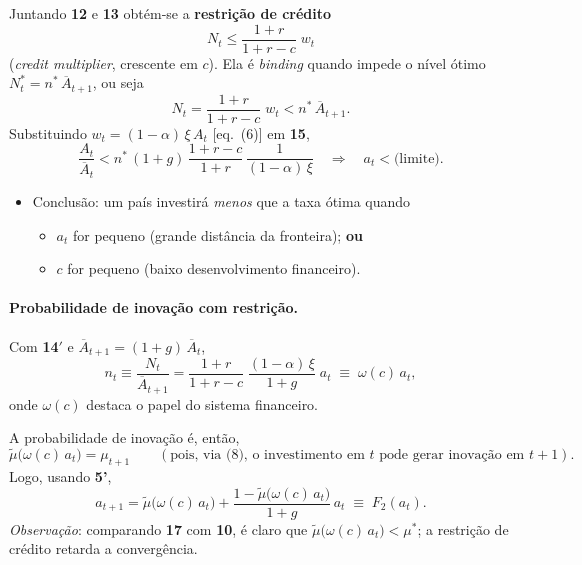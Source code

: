 \documentclass[a4paper,12pt]{article}[abntex2]
\begin{document}
\medskip
Juntando \textbf{12} e \textbf{13} obtém‐se a \textbf{restrição de crédito}
\[
    \boxed{N_t \le \frac{1+r}{1+r-c}\;w_t}
    \tag{14$'$}
\]
(\emph{credit multiplier}, crescente em $c$).  
Ela é \emph{binding} quando impede o nível ótimo $N_t^{\ast}=n^{\ast}\,\overline{A}_{t+1}$, ou seja
\[
    N_t = \frac{1+r}{1+r-c}\;w_t
          < n^{\ast}\,\overline{A}_{t+1}.
    \tag{15}
\]
Substituindo $w_t=(1-\alpha)\,\xi\,A_t$ [eq.\ (6)] em \textbf{15},
\[
    \frac{A_t}{\overline{A}_t}
      < n^{\ast}\,(1+g)\,
        \frac{1+r-c}{1+r}\,
        \frac{1}{(1-\alpha)\,\xi}
      \quad\Longrightarrow\quad
      a_t<\text{(limite)}.
    \tag{16}
\]
\begin{itemize}
    \item Conclusão: um país investirá \emph{menos} que a taxa ótima quando
          \begin{itemize}
              \item $a_t$ for pequeno (grande distância da fronteira); \textbf{ou}
              \item $c$ for pequeno (baixo desenvolvimento financeiro).
          \end{itemize}
\end{itemize}

\paragraph{Probabilidade de inovação com restrição.}
Com \textbf{14$'$} e $\overline{A}_{t+1}=(1+g)\,\overline{A}_t$,
\[
    n_t
      \equiv \frac{N_t}{\overline{A}_{t+1}}
      = \frac{1+r}{1+r-c}\;
        \frac{(1-\alpha)\,\xi}{1+g}\;
        a_t
      \;\equiv\; \omega(c)\,a_t,
\]
onde $\omega(c)$ destaca o papel do sistema financeiro.

A probabilidade de inovação é, então,
\[
    \tilde{\mu}\bigl(\omega(c)\,a_t\bigr)=\mu_{t+1}
    \qquad(\text{pois, via (8), o investimento em }t
    \text{ pode gerar inovação em }t\!+\!1).
\]
Logo, usando \textbf{5'},
\[
    a_{t+1}
      = \tilde{\mu}\!\bigl(\omega(c)\,a_t\bigr)
        + \frac{1-\tilde{\mu}\!\bigl(\omega(c)\,a_t\bigr)}{1+g}\,a_t
      \;\equiv\; F_{2}(a_t).
    \tag{17}
\]
\emph{Observação}: comparando \textbf{17} com \textbf{10}, é claro que
$\tilde{\mu}\bigl(\omega(c)\,a_t\bigr)<\mu^{\ast}$;  
a restrição de crédito retarda a convergência.

\end{document}
